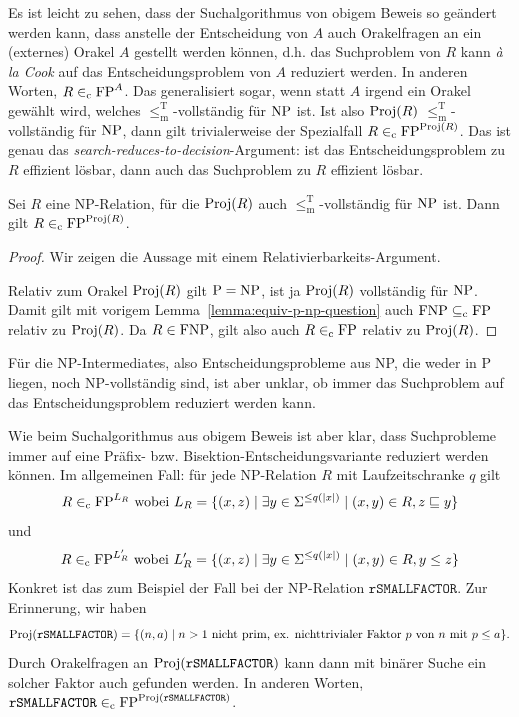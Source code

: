 Es ist leicht zu sehen, dass der Suchalgorithmus von obigem Beweis so geändert werden kann, dass anstelle der Entscheidung von $A$ auch Orakelfragen an ein (externes) Orakel $A$ gestellt werden können, d.h. das Suchproblem von $R$ kann \emph{à la Cook} auf das Entscheidungsproblem von $A$ reduziert werden. In anderen Worten, $R\in_\mathrm{c} \mathrm{FP}^A$. Das generalisiert sogar, wenn statt $A$ irgend ein Orakel gewählt wird, welches $\leq_\mathrm{m}^\mathrm{T}$-vollständig für $\mathrm{NP}$ ist. Ist also $\operatorname{Proj}(R)$ $\leq_\mathrm{m}^\mathrm{T}$-vollständig für $\mathrm{NP}$, dann gilt trivialerweise der Spezialfall $R\in_\mathrm{c} \mathrm{FP}^{\operatorname{Proj}(R)}$. Das ist genau das \emph{search-reduces-to-decision}-Argument: ist das Entscheidungsproblem zu $R$ effizient lösbar, dann auch das Suchproblem zu $R$ effizient lösbar.

\begin{corollary}\label{cor:search-to-decision}
    Sei $R$ eine NP-Relation, für die $\operatorname{Proj}(R)$ auch $\leq_\mathrm{m}^\mathrm{T}$-vollständig für $\mathrm{NP}$ ist.
    Dann gilt $R\in_\mathrm{c} \mathrm{FP}^{\operatorname{Proj}(R)}$.
\end{corollary}
\begin{proof}
    Wir zeigen die Aussage mit einem Relativierbarkeits-Argument.

    Relativ zum Orakel $\operatorname{Proj}(R)$ gilt $\mathrm{P}=\mathrm{NP}$, ist ja $\operatorname{Proj}(R)$ vollständig für $\mathrm{NP}$. Damit gilt mit vorigem Lemma~\ref{lemma:equiv-p-np-question} auch $\mathrm{FNP} \subseteq_\mathrm{c} \mathrm{FP}$ relativ zu $\operatorname{Proj}(R)$.
    Da $R\in \mathrm{FNP}$, gilt also auch $R\in_\mathrm{c} \mathrm{FP}$ relativ zu $\operatorname{Proj}(R)$.
\end{proof}

Für die NP-Intermediates, also Entscheidungsprobleme aus NP, die weder in P liegen, noch NP-vollständig sind, ist aber unklar, ob immer das Suchproblem auf das Entscheidungsproblem reduziert werden kann.

Wie beim Suchalgorithmus aus obigem Beweis ist aber klar, dass Suchprobleme immer auf eine Präfix- bzw. Bisektion-Entscheidungsvariante reduziert werden können.
Im allgemeinen Fall: für jede NP-Relation $R$ mit Laufzeitschranke $q$ gilt
\[ R \in_\mathrm{c} \mathrm{FP}^{L_R} \text{ wobei } L_R = \{ (x, z) \mid \exists y\in\Sigma^{\leq q(|x|)} \mid (x, y)\in R, z\sqsubseteq y \} \]
und 
\[ R \in_\mathrm{c} \mathrm{FP}^{L'_R} \text{ wobei } L'_R = \{ (x, z) \mid \exists y\in\Sigma^{\leq q(|x|)} \mid (x, y) \in R, y\leq z \} \]
Konkret ist das zum Beispiel der Fall bei der NP-Relation $\mathtt{rSMALLFACTOR}$. Zur Erinnerung, wir haben
\[ \operatorname{Proj}(\mathtt{rSMALLFACTOR}) = \{ (n,a)\mid \text{$n>1$ nicht prim, ex. nichttrivialer Faktor $p$ von $n$ mit $p\leq a$} \}. \]
Durch Orakelfragen an $\operatorname{Proj}(\mathtt{rSMALLFACTOR})$ kann dann mit binärer Suche ein solcher Faktor auch gefunden werden.
In anderen Worten, $\mathtt{rSMALLFACTOR} \in_\mathrm{c} \mathrm{FP}^{\operatorname{Proj}(\mathtt{rSMALLFACTOR})}$.

